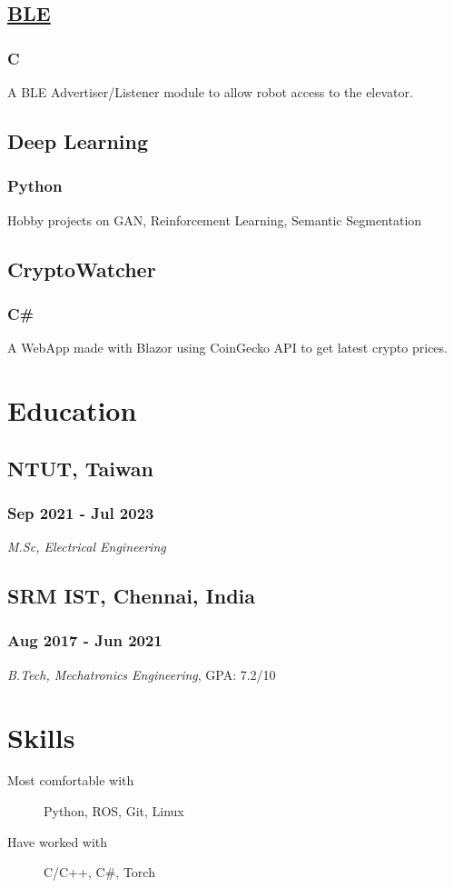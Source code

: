 \documentclass[letterpaper]{article}
\begin{document}
\subsection{\href{https://github.com/sudhanv09/BLE-Advertiser-Listener}{BLE}}
\label{sec:org21024bf}
\subsubsection{C}
\label{sec:orgea2c74c}
A BLE Advertiser/Listener module to allow robot access to the elevator.

\subsection{Deep Learning}
\label{sec:org474f543}
\subsubsection{Python}
\label{sec:orge3fb0e4}
Hobby projects on GAN, Reinforcement Learning, Semantic Segmentation

\subsection{CryptoWatcher}
\label{sec:org2b7b1db}
\subsubsection{C\#}
\label{sec:org9483d60}
A WebApp made with Blazor using CoinGecko API to get latest crypto prices.

\section{Education}
\label{sec:org7cb95c2}
\subsection{NTUT, Taiwan}
\label{sec:orgfd3c46c}
\subsubsection{Sep 2021 - Jul 2023}
\label{sec:org23345d4}
\emph{M.Sc, Electrical Engineering}

\subsection{SRM IST, Chennai, India}
\label{sec:org8e8653a}
\subsubsection{Aug 2017 - Jun 2021}
\label{sec:org3a93da4}
\emph{B.Tech, Mechatronics Engineering}, GPA: 7.2/10
\section{Skills}
\label{sec:org2c5c0a0}
\begin{description}
\item[{Most comfortable with}] Python, ROS, Git, Linux
\item[{Have worked with}] C/C++, C\#, Torch
\end{description}
\end{document}
